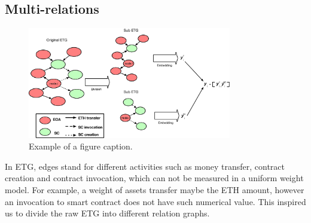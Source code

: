 \subsection{Multi-relations}

\begin{figure}[htbp]
	\centering
	\label{fig_graph_split}
	\includegraphics[width=3.5in]{fig/graph_split.eps}
	\caption{Example of a figure caption.}


\end{figure}

In ETG, edges stand for different activities such as money transfer, contract creation and contract invocation, which can not be measured in a uniform weight model. For example, a weight of assets transfer maybe the ETH amount, however an invocation to smart contract does not have such numerical value. This inspired us to divide the raw ETG into different relation graphs.






